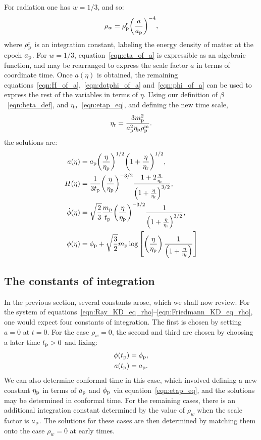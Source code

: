 For radiation one has \(w=1/3\), and so:
%
\begin{equation}
  \rho_w = \rho_{\mathrm{p}}^{\mathrm{r}}{\left(\frac{a}{a_{\mathrm{p}}}\right)}^{-4},
\end{equation}
%
where \(\rho_{\mathrm{p}}^{\mathrm{r}}\) is an integration constant, labeling the energy density of matter at the epoch \(a_{\mathrm{p}}\).  For \(w=1/3\), equation~\eqref{eqn:eta_of_a} is expressible as an algebraic function, and may be rearranged to express the scale factor \(a\) in terms of coordinate time. Once \(a(\eta)\) is obtained, the remaining equations~\eqref{eqn:H_of_a},~\eqref{eqn:dotphi_of_a} and~\eqref{eqn:phi_of_a} can be used to express the rest of the variables in terms of \(\eta\). Using our definition of \(\beta\)~\ref{eqn:beta_def}, and \(\eta_{\mathrm{p}}\)~\ref{eqn:etap_eq}, and defining the new time scale,
%
\begin{equation}
  \eta_{\mathrm{r}} = \frac{3m_{\mathrm{p}}^2}{a_{\mathrm{p}}^2\eta_{\mathrm{p}}\rho_{\mathrm{p}}^{\mathrm{m}}}.
  \label{eqn:etar}
\end{equation}
%
the solutions are:
%
\begin{align}
  a(\eta)
  &=
  a_{\mathrm{p}}{\left(\frac{\eta}{\eta_{\mathrm{p}}}\right)}^{1/2}
  {\left({1+\frac{\eta}{\eta_{\mathrm{r}}}}\right)}^{1/2},
  \\
  H(\eta) 
  &= 
  \frac{1}{3t_{\mathrm{p}}}{\left(\frac{\eta}{\eta_{\mathrm{p}}}\right)}^{-3/2}
  \frac{1+ 2\frac{\eta}{\eta_{\mathrm{r}}}}
  {{\left(1+ \frac{\eta}{\eta_{\mathrm{r}}}\right)}^{3/2}},
  \\
  \dot{\phi}(\eta) 
  &=
  \sqrt{\frac{2}{3}}\frac{m_{\mathrm{p}}}{t_{\mathrm{p}}}
  {\left(\frac{\eta}{\eta_{\mathrm{p}}}\right)}^{-3/2}
  \frac{1}{{\left(1+ \frac{\eta}{\eta_{\mathrm{r}}}\right)}^{3/2}},
  \\ 
  \phi(\eta) 
  &=
  \phi_{\mathrm{p}}+\sqrt {\frac{3}{2}}m_{\mathrm{p}}\log  
  \left[
  \left(\frac{\eta}{\eta_{\mathrm{p}}}\right)
  \frac {1}{\left(1+ \frac{\eta}{\eta_{\mathrm{r}}}\right)} 
  \right] 
\end{align}
%

\subsection{The constants of integration}
\label{sec:constants}
In the previous section, several constants arose, which we shall now review. For the system of equations~\eqref{eqn:Ray_KD_eq_rho}--\eqref{eqn:Friedmann_KD_eq_rho}, one would expect four constants of integration. The first is chosen by setting \(a=0\) at \(t=0\). For the case \(\rho_w=0\), the second and third are chosen by choosing a later time \(t_{\mathrm{p}}>0\) and fixing:
%
\begin{align}
  \phi(t_{\mathrm{p}}) &= \phi_{\mathrm{p}}, \nonumber\\
  a(t_{\mathrm{p}}) &= a_{\mathrm{p}}. \nonumber
\end{align}
%
We can also determine conformal time in this case, which involved defining a new constant \(\eta_{\mathrm{p}}\) in terms of \(a_{\mathrm{p}}\) and \(\phi_{\mathrm{p}}\) via equation~\eqref{eqn:etap_eq}, and the solutions may be determined in conformal time. For the remaining cases, there is an additional integration constant determined by the value of \(\rho_w\) when the scale factor is \(a_{\mathrm{p}}\). The solutions for these cases are then determined by matching them onto the case \(\rho_w=0\) at early times.

